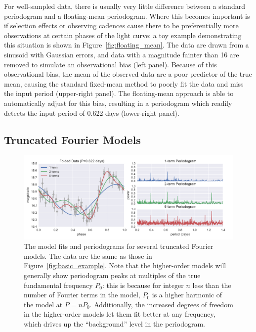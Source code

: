 \documentclass{emulateapj}
\newcommand{\Fig}[1]{Figure~\ref{fig:#1}}
\newcommand{\fig}[1]{\Fig{#1}}
\newcommand{\figlabel}[1]{\label{fig:#1}}
\newcommand{\sectlabel}[1]{\label{sect:#1}}
\begin{document}
For well-sampled data, there is usually very little difference between a standard periodogram and a floating-mean periodogram. Where this becomes important is if selection effects or observing cadences cause there to be preferentially more observations at certain phases of the light curve: a toy example demonstrating this situation is shown in \fig{floating_mean}. The data are drawn from a sinusoid with Gaussian errors, and data with a magnitude fainter than 16 are removed to simulate an observational bias (left panel). Because of this observational bias, the mean of the observed data are a poor predictor of the true mean, causing the standard fixed-mean method to poorly fit the data and miss the input period (upper-right panel). The floating-mean approach is able to automatically adjust for this bias, resulting in a periodogram which readily detects the input period of 0.622 days (lower-right panel).


\subsection{Truncated Fourier Models}
\sectlabel{multiterm}

\begin{figure}
  \centering
  \includegraphics[width=\textwidth]{fig03.pdf}
  \caption{
    The model fits and periodograms for several truncated Fourier models.
    The data are the same as those in \fig{basic_example}. Note that the
    higher-order models will generally show periodogram peaks at multiples
    of the true fundamental frequency $P_0$: this is because for integer $n$
    less than the number of Fourier terms in the model, $P_0$ is a higher
    harmonic of the model at $P=nP_0$. Additionally, the increased degrees of
    freedom in the higher-order models let them fit better at any frequency,
    which drives up the ``background'' level in the periodogram.
  }
  \figlabel{multiterm_example}
\end{figure}
\end{document}
